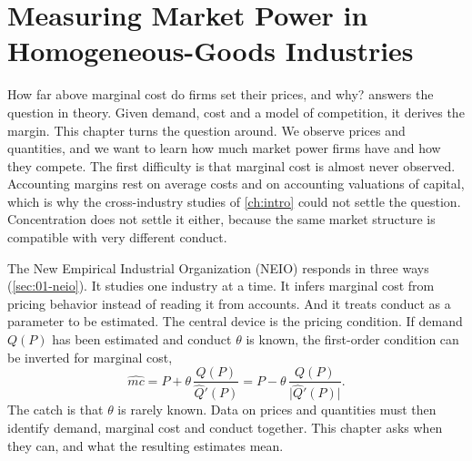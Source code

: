 \chapter{Measuring Market Power in Homogeneous-Goods Industries}\label{ch:conduct}

How far above marginal cost do firms set their prices, and why?  answers the question in theory.
Given demand, cost and a model of competition, it derives the margin. This chapter turns the question around. We
observe prices and quantities, and we want to learn how much market power firms have and how they compete. The first
difficulty is that marginal cost is almost never observed. Accounting margins rest on average costs and on accounting
valuations of capital, which is why the cross-industry studies of \cref{ch:intro} could not settle the question.
Concentration does not settle it either, because the same market structure is compatible with very different conduct.

The New Empirical Industrial Organization (NEIO) responds in three ways (\cref{sec:01-neio}). It studies one industry
at a time. It infers marginal cost from pricing behavior instead of reading it from accounts. And it treats conduct as
a parameter to be estimated. The central device is the pricing condition. If demand $Q(P)$ has been estimated and
conduct $\theta$ is known, the first-order condition can be inverted for marginal cost,
\begin{equation*}
\widehat{mc} = P + \theta\,\frac{Q(P)}{\hat Q'(P)} = P - \theta\,\frac{Q(P)}{\lvert \hat Q'(P)\rvert} .
\end{equation*}
The catch is that $\theta$ is rarely known. Data on prices and quantities must then identify demand, marginal cost and
conduct together. This chapter asks when they can, and what the resulting estimates mean.

